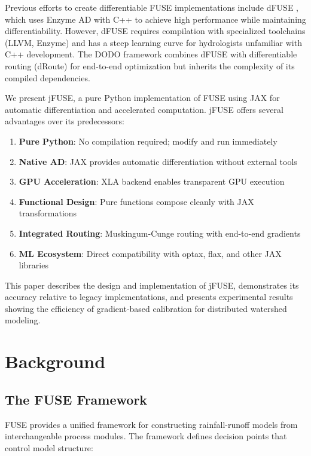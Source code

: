 \documentclass[11pt,a4paper]{article}
\begin{document}
Previous efforts to create differentiable FUSE implementations include dFUSE \citep{dfuse2024}, which uses Enzyme AD with C++ to achieve high performance while maintaining differentiability. However, dFUSE requires compilation with specialized toolchains (LLVM, Enzyme) and has a steep learning curve for hydrologists unfamiliar with C++ development. The DODO framework \citep{dodo2024} combines dFUSE with differentiable routing (dRoute) for end-to-end optimization but inherits the complexity of its compiled dependencies.

We present jFUSE, a pure Python implementation of FUSE using JAX \citep{jax2018github} for automatic differentiation and accelerated computation. jFUSE offers several advantages over its predecessors:

\begin{enumerate}
    \item \textbf{Pure Python}: No compilation required; modify and run immediately
    \item \textbf{Native AD}: JAX provides automatic differentiation without external tools
    \item \textbf{GPU Acceleration}: XLA backend enables transparent GPU execution
    \item \textbf{Functional Design}: Pure functions compose cleanly with JAX transformations
    \item \textbf{Integrated Routing}: Muskingum-Cunge routing with end-to-end gradients
    \item \textbf{ML Ecosystem}: Direct compatibility with optax, flax, and other JAX libraries
\end{enumerate}

This paper describes the design and implementation of jFUSE, demonstrates its accuracy relative to legacy implementations, and presents experimental results showing the efficiency of gradient-based calibration for distributed watershed modeling.

\section{Background}

\subsection{The FUSE Framework}

FUSE \citep{clark2008framework} provides a unified framework for constructing rainfall-runoff models from interchangeable process modules. The framework defines decision points that control model structure:
\end{document}
